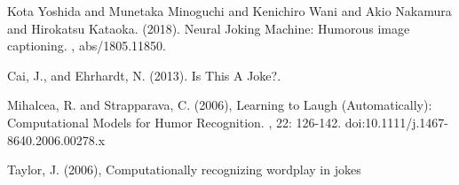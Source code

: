 \documentclass[twoside,twocolumn]{article}
\begin{document}
\begin{thebibliography}{99} %


Kota Yoshida and Munetaka Minoguchi and Kenichiro Wani and Akio Nakamura and Hirokatsu Kataoka. (2018).
\newblock Neural Joking Machine: Humorous image captioning.
, abs/1805.11850.

Cai, J., and Ehrhardt, N. (2013). 
\newblock Is This A Joke?.

Mihalcea, R. and Strapparava, C. (2006), 
\newblock Learning to Laugh (Automatically): Computational Models for Humor Recognition.
, 22: 126-142. doi:10.1111/j.1467-8640.2006.00278.x

Taylor, J. (2006), 
\newblock Computationally recognizing wordplay in jokes

\end{thebibliography}

\end{document}
